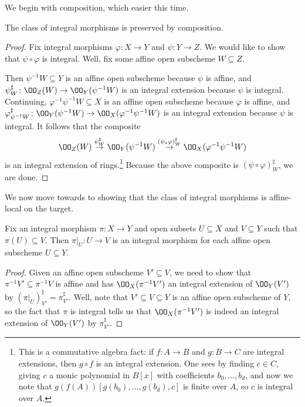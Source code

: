 \documentclass[../notes.tex]{subfiles}
\begin{document}
We begin with composition, which easier this time.
\begin{lemma}
	The class of integral morphisms is preserved by composition.
\end{lemma}
\begin{proof}
	Fix integral morphisms $\varphi\colon X\to Y$ and $\psi\colon Y\to Z$. We would like to show that $\psi\circ\varphi$ is integral. Well, fix some affine open subscheme $W\subseteq Z$.
	
	Then $\psi^{-1}W\subseteq Y$ is an affine open subscheme because $\psi$ is affine, and $\psi^\sharp_W\colon\OO_Z(W)\to\OO_Y(\psi^{-1}W)$ is an integral extension because $\psi$ is integral. Continuing, $\varphi^{-1}\psi^{-1}W\subseteq X$ is an affine open subscheme because $\varphi$ is affine, and $\varphi^\sharp_{\psi^{-1}W}\colon\OO_Y(\psi^{-1}W)\to\OO_X(\varphi^{-1}\psi^{-1}W)$ is an integral extension because $\psi$ is integral. It follows that the composite
	\[\OO_Z(W)\stackrel{\psi^\sharp_W}\to\OO_Y(\psi^{-1}W)\stackrel{(\psi_*\varphi)^\sharp_W}\to\OO_X(\varphi^{-1}\psi^{-1}W)\]
	is an integral extension of rings.\footnote{This is a commutative algebra fact: if $f\colon A\to B$ and $g\colon B\to C$ are integral extensions, then $g\circ f$ is an integral extension. One sees by finding $c\in C$, giving $c$ a monic polynomial in $B[x]$ with coefficients $b_0,\ldots,b_d$, and now we note that $g(f(A))[g(b_0),\ldots,g(b_d),c]$ is finite over $A$, so $c$ is integral over $A$.} Because the above composite is $(\psi\circ\varphi)^\sharp_W$, we are done.
\end{proof}
We now move towards to showing that the class of integral morphisms is affine-local on the target.
\begin{lemma} \label{lem:restrict-integral}
	Fix an integral morphism $\pi\colon X\to Y$ and open subsets $U\subseteq X$ and $V\subseteq Y$ such that $\pi(U)\subseteq V$. Then $\pi|_U\colon U\to V$ is an integral morphism for each affine open subscheme $U\subseteq Y$.
\end{lemma}
\begin{proof}
	Given an affine open subscheme $V'\subseteq V$, we need to show that $\pi^{-1}V'\subseteq\pi^{-1}V$ is affine and has $\OO_X(\pi^{-1}V')$ an integral extension of $\OO_Y(V')$ by $(\pi|_{U})^\sharp_{V'}=\pi^\sharp_{V'}$. Well, note that $V'\subseteq V\subseteq Y$ is an affine open subscheme of $Y$, so the fact that $\pi$ is integral tells us that $\OO_X(\pi^{-1}V')$ is indeed an integral extension of $\OO_Y(V')$ by $\pi^\sharp_{V'}$.
\end{proof}
\end{document}
